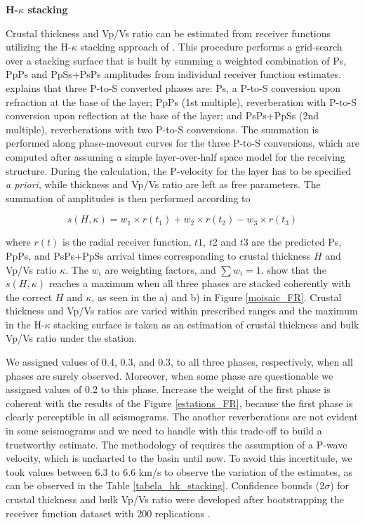 \documentclass[paper,11pt]{geophysics}
\begin{document}
\begin{flushleft}
\textbf{H-$\kappa$ stacking}
\end{flushleft}

Crustal thickness and Vp/Vs ratio can be estimated from receiver functions utilizing the H-$\kappa$ stacking approach of \cite{zhu_moho_2000}. This procedure performs a grid-search over a stacking surface that is built by summing a weighted combination of Ps, PpPs and PpSs+PsPs amplitudes from individual receiver function estimates. \cite{zhu_moho_2000} explains that three P-to-S converted phases are: Ps, a P-to-S conversion upon refraction at the base of the layer; PpPs (1st multiple), reverberation with P-to-S conversion upon reflection at the base of the layer; and PsPs+PpSs (2nd multiple), reverberations with two P-to-S conversions. The summation is performed along phase-moveout curves for the three P-to-S conversions, which are computed after assuming a simple layer-over-half space model for the receiving structure. During the calculation, the P-velocity for the layer has to be specified \textit{a priori}, while thickness and Vp/Vs ratio are left as free parameters. The summation of amplitudes is then performed according to

\begin{linenomath*}
\begin{equation}
s(H,\kappa) = w_{1} \times r(t_{1}) + w_{2} \times r(t_{2}) - w_{3} \times r(t_{3})
\end{equation}
\end{linenomath*}

where $r(t)$ is the radial receiver function, $t1$, $t2$ and $t3$ are the predicted Ps, PpPs, and PsPs+PpSs arrival times corresponding to crustal thickness $H$ and  Vp/Vs ratio $\kappa$. The $w_{i}$ are weighting factors, and $\sum w_{i} = 1$. \cite{zhu_moho_2000} show that the $s(H,\kappa)$ reaches a maximum when all three phases are stacked coherently with the correct $H$ and $\kappa$, as seen in the a) and b) in Figure \ref{moisaic_FR}. Crustal thickness and Vp/Vs ratios are varied within prescribed ranges and the maximum in the H-$\kappa$ stacking surface is taken as an estimation of crustal thickness and bulk Vp/Vs ratio under the station.

We assigned values of 0.4, 0.3, and 0.3, to all three phases, respectively, when all phases are surely observed. Moreover, when some phase are questionable we assigned values of 0.2 to this phase. Increase the weight of the first phase is coherent with the results of the Figure \ref{estations_FR}, because the first phase is clearly perceptible in all seismograms. The another reverberations are not evident in some seismograms and we need to handle with this trade-off to build a trustworthy estimate. The methodology of \cite{zhu_moho_2000} requires the assumption of a P-wave velocity, which is uncharted to the basin until now. To avoid this incertitude, we took values between 6.3 to 6.6 km/s to observe the variation of the estimates, as can be observed in the Table \ref{tabela_hk_stacking}. Confidence bounds (2$\sigma$) for crustal thickness and bulk Vp/Vs ratio were developed after bootstrapping the receiver function dataset with 200 replications \citep{efron_statistical_1991}. 
\end{document}
